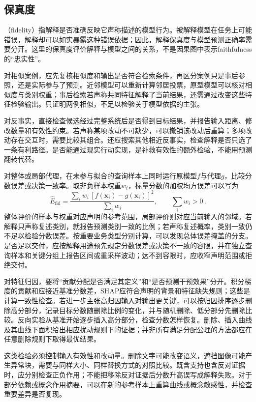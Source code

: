 \subsection{保真度}
\label{sec:interpretability-quality-fidelity}

（fidelity）指解释是否准确反映它声称描述的模型行为。被解释模型在任务上可能错误，解释却可以如实暴露这种错误依据；因此，解释保真度与模型预测正确率需要分开。这里的保真度评价解释与模型之间的关系，不是因果图中表示faithfulness的“忠实性”。

对相似案例，应先复核相似度和输出是否符合检索条件，再区分案例只是事后参照，还是实际参与了预测。近邻模型可以重新计算邻居投票，原型模型可以核对相似度与类别权重；事后检索若声称共同特征解释了当前结果，还需通过改变这些特征检验输出。只证明两例相似，不足以检验关于模型依据的主张。

对反事实，直接检查候选经过完整系统后是否得到目标结果，并报告输入距离、修改数量和有效性约束。若声称某项改动不可缺少，可以撤销该改动后重算；多项改动存在交互时，需要比较其组合。还应搜索其他相近反事实，检查解释是否只选了一条有利路径。是否能通过现实行动实现，是补救有效性的额外检验，不能用预测翻转代替。

对整体或局部代理，在未参与拟合的查询样本上同时运行原模型$f$与代理$g$，比较分数误差或决策一致率。取非负样本权重$w_i$，标量分数的加权均方误差可以写为
\[
 \widehat E_{\mathrm{fid}}
 =\frac{\sum_i w_i\,[f(\bm{x}_i)-g(\bm{x}_i)]^2}
        {\sum_i w_i},\qquad \sum_iw_i>0\, .
\]
整体评价的样本与权重对应声明的参考范围，局部评价则对应当前输入的邻域。若解释只声称复述类别，就报告预测类别一致的比例；若声称复述概率，类别一致仍不足以检验分数误差。按重要业务类型分别计算，可以发现总体误差掩盖的分支。是否足以交付，应按解释用途预先规定分数误差或决策不一致的容限，并在独立查询样本和关键分组上报告区间或重采样波动；达不到容限时，应收窄声明范围或拒绝交付。

对特征归因，要将“贡献分配是否满足其定义”和“是否预测干预效果”分开。积分梯度的贡献和应接近基准分数差，SHAP应符合声明的背景和特征缺失规则；这些是计算一致性检查。若进一步主张高归因输入对输出更关键，可以按归因排序逐步删除高分部分，记录目标分数随删除比例的变化，并与随机删除、低分部分先删除比较。反向实验从基准开始逐步插入高分部分，检查分数怎样恢复。删除、插入曲线及其曲线下面积给出相应扰动规则下的证据；并非所有满足分配公理的方法都应在任意删除规则下取得最优结果。

这类检验必须控制输入有效性和改动量。删除文字可能改变语义，遮挡图像可能产生异常块，需要与同样大小、同样替换方式的对照比较。既含支持也含反对证据时，应分别检查正负作用；不能把移除反对证据后分数升高误写成解释失败。对于部分依赖或概念作用摘要，可以在新的参考样本上重算曲线或概念敏感性，并检查重要差异是否复现。

